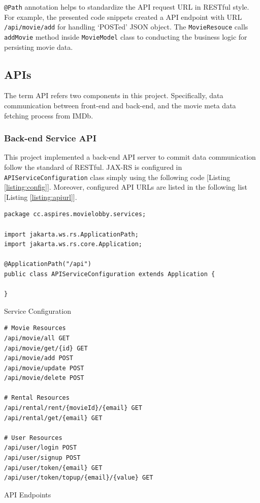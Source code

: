 \documentclass{article}
\begin{document}
\verb|@Path| annotation helps to standardize the API request URL in RESTful style. For example, the presented code snippets created a API endpoint with URL \verb|/api/movie/add| for handling `POSTed' JSON object. The \verb|MovieResouce| calls \verb|addMovie| method inside \verb|MovieModel| class to conducting the business logic for persisting movie data.

\subsection{APIs}

The term API refers two components in this project. Specifically, data communication between front-end and back-end, and the movie meta data fetching process from IMDb. 

\subsubsection{Back-end Service API}

This project implemented a back-end API server to commit data communication follow the standard of RESTful. JAX-RS is configured in \verb|APIServiceConfiguration| class simply using the following code [Listing \ref{listing:config}]. Moreover, configured API URLs are listed in the following list [Listing \ref{listing:apiurl}].

\begin{listing}[!htp]
\begin{verbatim}
package cc.aspires.movielobby.services;

import jakarta.ws.rs.ApplicationPath;
import jakarta.ws.rs.core.Application;

@ApplicationPath("/api")
public class APIServiceConfiguration extends Application { 
    
}
\end{verbatim}
\caption{Service Configuration}
\label{listing:config}
\end{listing}

\begin{listing}[!htp]
\begin{verbatim}
# Movie Resources
/api/movie/all GET
/api/movie/get/{id} GET
/api/movie/add POST
/api/movie/update POST
/api/movie/delete POST

# Rental Resources
/api/rental/rent/{movieId}/{email} GET
/api/rental/get/{email} GET

# User Resources
/api/user/login POST
/api/user/signup POST
/api/user/token/{email} GET
/api/user/token/topup/{email}/{value} GET
\end{verbatim}
\caption{API Endpoints}
\label{listing:apiurl}
\end{listing}
\end{document}
